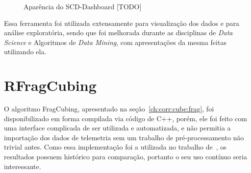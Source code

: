 \begin{figure}[ht]
	\caption{\color{red} Aparência do SCD-Dashboard [TODO]}
	\vspace{6mm}
	\begin{center}
	\end{center}
	\vspace{4mm}
	\legenda{}
	\label{fig:scddashboard}
\end{figure}

Essa ferramenta foi utilizada extensamente para visualização dos dados e para análise exploratória, sendo que foi melhorada durante as disciplinas de \textit{Data Science} e Algoritmos de \textit{Data Mining}, com apresentações da mesma feitas utilizando ela.

\section{RFragCubing}
\label{ch:impl:rfrag}

O algoritmo FragCubing, apresentado na seção~\ref{ch:corr:cube:frag}, foi disponibilizado em forma compilada via código de C++, porém, ele foi feito com uma interface complicada de ser utilizada e automatizada, e não permitia a importação dos dados de telemetria sem um trabalho de pré-processamento não trivial antes.
Como essa implementação foi a utilizada no trabalho de~\cite{silva:2015:abordagensParaCubo}, os resultados possuem histórico para comparação, portanto o seu uso contínuo seria interessante.

